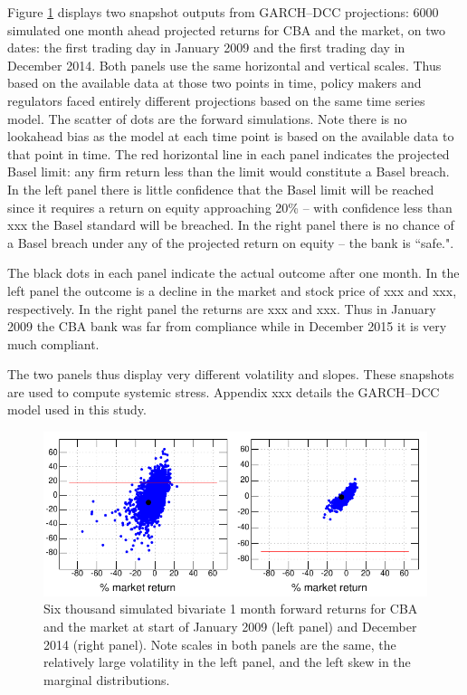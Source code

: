 \documentclass[authoryear]{elsarticle}
\newcommand{\fref}[1]{Figure \ref{#1}}
\begin{document}
 \fref{simulation}   displays two snapshot outputs from GARCH--DCC projections:  6000  simulated one month ahead projected returns for  CBA and the market, on  two dates: the first trading day in January 2009 and the first trading day in December 2014.    Both panels use the same horizontal and vertical scales.   Thus based on the available data at those two points in  time, policy makers and regulators faced entirely different projections based on the same time series model.   The scatter of dots are the forward simulations.  Note there is no lookahead bias as the model at each time point is based on the available data to that point in time.    The red horizontal line in each panel indicates the projected Basel limit:  any firm return less than the limit would constitute a Basel breach.   In the left panel there is little confidence that the Basel limit will be reached since it requires a return on equity approaching 20\% -- with confidence less than xxx the Basel standard will be breached.  In the right panel there is no chance of a Basel breach under any of the projected return on equity -- the bank is ``safe.".   
 
 The black dots in each panel indicate the actual outcome after one month.    In the left panel the outcome is a decline in the market and stock price of xxx and xxx, respectively.    In the right panel the returns are xxx and xxx.    Thus in January  2009 the CBA bank was far from compliance while in December 2015 it is very much compliant.  
 
 The two panels thus display very different volatility and slopes.  These snapshots are used to compute systemic stress.   Appendix xxx details the GARCH--DCC model used in this study.

\begin{figure}[htbp]
\begin{center}
\includegraphics{simulation.pdf}
\caption{Six thousand simulated bivariate 1 month forward returns for CBA and the market at start of January 2009 (left panel)  and December 2014 (right panel). Note scales in both panels are the same, the relatively large volatility in the left panel, and the left skew in the  marginal distributions.}
\label{simulation}
\end{center}
\end{figure}
\end{document}
